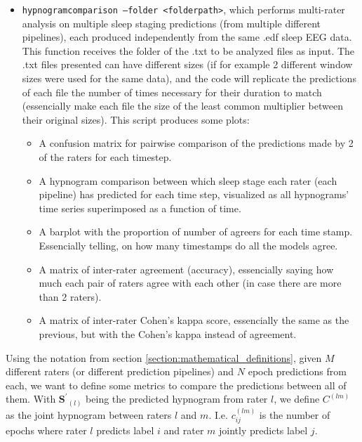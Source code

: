 \begin{itemize}
    \item \texttt{hypnogram\textunderscore comparison --folder <folderpath>}, which performs multi-rater analysis on multiple sleep staging predictions (from multiple different pipelines), each produced independently from the same .edf sleep EEG data. This function receives the folder of the .txt to be analyzed files as input. The .txt files presented can have different sizes (if for example 2 different window sizes were used for the same data), and the code will replicate the predictions of each file the number of times necessary for their duration to match (essencially make each file the size of the least common multiplier between their original sizes).
    This script produces some plots:
    \begin{itemize}
        \itemsep-0.3em
        \item A confusion matrix for pairwise comparison of the predictions made by 2 of the raters for each timestep.
        \item A hypnogram comparison between which sleep stage each rater (each pipeline) has predicted for each time step, visualized as all hypnograms' time series superimposed as a function of time.
        \item A barplot with the proportion of number of agreers for each time stamp. Essencially telling, on how many timestamps do all the models agree.
        \item A matrix of inter-rater agreement (accuracy), essencially saying how much each pair of raters agree with each other (in case there are more than 2 raters).
        \item A matrix of inter-rater Cohen's kappa score, essencially the same as the previous, but with the Cohen's kappa instead of agreement.
    \end{itemize}
\end{itemize}

Using the notation from section \ref{section:mathematical_definitions}, given $M$ different raters (or different prediction pipelines) and $N$ epoch predictions from each, we want to define some metrics to compare the predictions between all of them. 
With $\mathbf{S^{\prime}}_{(l)}$ being the predicted hypnogram from rater $l$, we define $C^{(lm)}$ as the joint hypnogram between raters $l$ and $m$. I.e. $c_{ij}^{(lm)}$ is the number of epochs where rater $l$ predicts label $i$ and rater $m$ jointly predicts label $j$.

